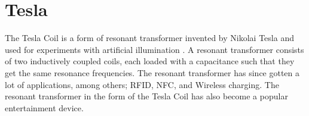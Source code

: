\section{Tesla}
\label{tesla}
The Tesla Coil is a form of resonant transformer invented by Nikolai Tesla and used for experiments with artificial illumination \citep{5570149}. A resonant transformer consists of two inductively coupled coils, each loaded with a capacitance such that they get the same resonance frequencies. The resonant transformer has since gotten a lot of applications, among others; RFID, NFC, and Wireless charging. The resonant transformer in the form of the Tesla Coil has also become a popular entertainment device.
